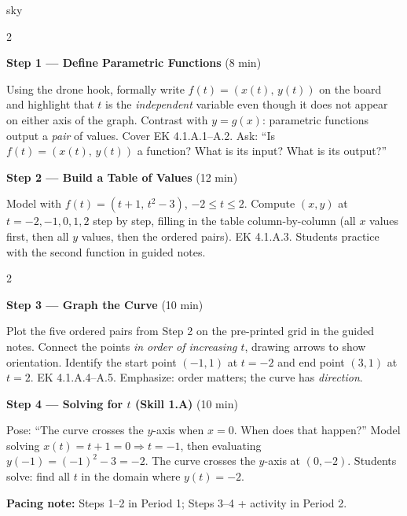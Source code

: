 \documentclass[10pt]{article}
\begin{document}
\begin{skillbox}{sky}
\begin{multicols}{2}

\textbf{Step 1 --- Define Parametric Functions} (8 min)

Using the drone hook, formally write $f(t) = (x(t),\, y(t))$ on the
board and highlight that $t$ is the \emph{independent} variable even
though it does not appear on either axis of the graph. Contrast with
$y = g(x)$: parametric functions output a \emph{pair} of values. Cover
EK 4.1.A.1--A.2. Ask: ``Is $f(t) = (x(t),\, y(t))$ a function? What
is its input? What is its output?''

\columnbreak

\textbf{Step 2 --- Build a Table of Values} (12 min)

Model with $f(t) = (t+1,\, t^2 - 3)$, $-2 \le t \le 2$. Compute
$(x, y)$ at $t = -2, -1, 0, 1, 2$ step by step, filling in the table
column-by-column (all $x$ values first, then all $y$ values, then the
ordered pairs). EK 4.1.A.3. Students practice with the second function
in guided notes.

\end{multicols}

\begin{multicols}{2}

\textbf{Step 3 --- Graph the Curve} (10 min)

Plot the five ordered pairs from Step 2 on the pre-printed grid in the
guided notes. Connect the points \emph{in order of increasing $t$},
drawing arrows to show orientation. Identify the start point $(-1, 1)$
at $t = -2$ and end point $(3, 1)$ at $t = 2$. EK 4.1.A.4--A.5.
Emphasize: order matters; the curve has \emph{direction}.

\columnbreak

\textbf{Step 4 --- Solving for $t$ (Skill 1.A)} (10 min)

Pose: ``The curve crosses the $y$-axis when $x = 0$. When does that
happen?'' Model solving $x(t) = t+1 = 0 \Rightarrow t = -1$, then
evaluating $y(-1) = (-1)^2 - 3 = -2$. The curve crosses the $y$-axis
at $(0, -2)$. Students solve: find all $t$ in the domain where $y(t) = -2$.

\end{multicols}

\smallskip
\textbf{Pacing note:} Steps 1--2 in Period 1; Steps 3--4 + activity in Period 2.
\end{skillbox}
\end{document}
